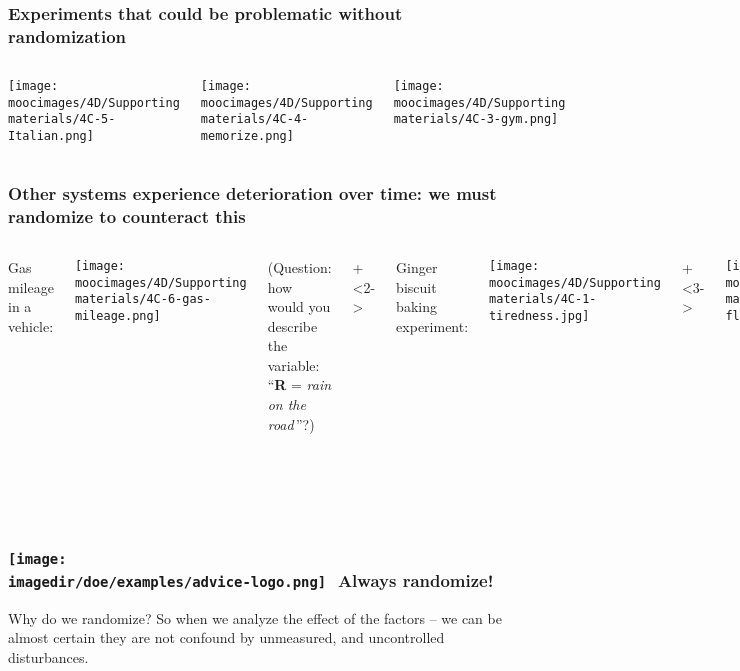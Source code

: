 \documentclass[handout,11pt,aspectratio=169,mathserif]{beamer}
\begin{document}
\begin{frame}\frametitle{Experiments that could be problematic without randomization}
	\begin{columns}[T]
			\texttt{[image: \\moocimages/4D/Supporting materials/4C-5-Italian.png]}
		
			\texttt{[image: \\moocimages/4D/Supporting materials/4C-4-memorize.png]}
		
			\texttt{[image: \\moocimages/4D/Supporting materials/4C-3-gym.png]}
			
	\end{columns}
\end{frame}

\begin{frame}\frametitle{Other systems experience deterioration over time: we must randomize to counteract this}
	\begin{columns}[T]
			Gas mileage in a vehicle: 
			
			\texttt{[image: \\moocimages/4D/Supporting materials/4C-6-gas-mileage.png]}
			
			\vspace{2.5cm}
			{\scriptsize (Question: how would you describe the variable: ``\textbf{R} = \emph{rain on the road}\,''?)}
		
			
			\onslide+<2->{
				Ginger biscuit baking experiment: 
			
				\texttt{[image: \\moocimages/4D/Supporting materials/4C-1-tiredness.jpg]}
			}
		
		
			\onslide+<3->{
				\texttt{[image: \\moocimages/4D/Supporting materials/7629039140\_c2e2cde0c8\_o-flickr-rusting.jpg]}
				
				\vspace{-0.52cm}
				{\tiny \href{https://secure.flickr.com/photos/mikecogh/7629039140}{Flickr: mikecogh}}
				
				
				{\scriptsize 
					This is a slow moving disturbance: we must account for it though if we run experiments that span several months, or years.
				}
			}
			
	\end{columns}
\end{frame}

\begin{frame}\frametitle{\texttt{[image: \\imagedir/doe/examples/advice-logo.png]}\,\, Always randomize!}
	
	\begin{exampleblock}{Why do we randomize?}
		So when we analyze the effect of the factors -- we can be almost certain they are not confound by unmeasured, and uncontrolled disturbances.
	\end{exampleblock}
	
\end{frame}
\end{document}
